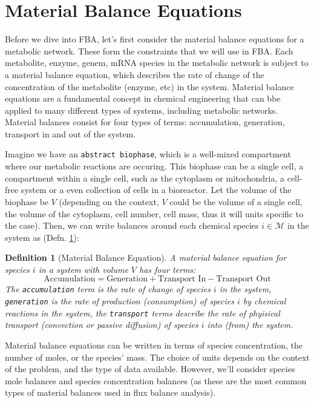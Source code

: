 \documentclass{article}[11pt]
\newtheorem{defn}{Definition}
\begin{document}
\section{Material Balance Equations}
Before we dive into FBA, let's first consider the material balance equations for a metabolic network. 
These form the constraints that we will use in FBA.
Each metabolite, enzyme, genem, mRNA species in the metabolic network is subject to a material balance equation, which describes the rate of change of the concentration of the metabolite (enzyme, etc) in the system.
Material balance equations are a fundamental concept in chemical engineering that can bbe applied to many different types of systems, including metabolic networks.
Material balances consist for four types of terms: accumulation, generation, transport in and out of the system.

Imagine we have an \texttt{abstract biophase}, which is a well-mixed compartment where our metabolic reactions are occuring.
This biophase can be a single cell, a compartment within a single cell, such as the cytoplasm or mitochondria, a cell-free system or a even collection of cells in 
a bioreactor. Let the volume of the biophase be $V$ (depending on the context, $V$ could be the volume of a single cell, the volume of the cytoplasm, cell number, cell mass, thus it will units specific to the case).
Then, we can write balances around each chemical species $i\in\mathcal{M}$ in the system as (Defn. \ref{defn-material-balance}):

\begin{mdframed}
\begin{defn}[Material Balance Equation]\label{defn-material-balance}
A material balance equation for species $i$ in a system with volume $V$ has four terms:
\begin{equation}\label{eqn-material-balance-words}
\text{Accumulation} = \text{Generation} + \text{Transport In} - \text{Transport Out}
\end{equation}
The \texttt{accumulation} term is the rate of change of species $i$ in the system, 
\texttt{generation} is the rate of production (consumption) of species $i$ by chemical reactions in the system,
the \texttt{transport} terms describe the rate of phyisical transport (convection or passive diffusion) of species $i$ into (from) the system.
\end{defn}
\end{mdframed}
Material balance equations can be written in terms of species concentration, the number of moles, or the species' mass.
The choice of units depends on the context of the problem, and the type of data available. 
However, we'll consider species mole balances and species concentration balances (as these are the most common types of material balances used in flux balance analysis).
\end{document}
